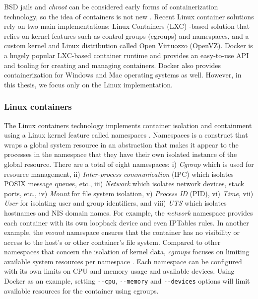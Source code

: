 \documentclass[english, 12pt, a4paper, sci, utf8, a-2b, online]{aaltothesis}
\begin{document}
BSD jails and \emph{chroot} can be considered early forms of containerization technology, so the idea of containers is not new \cite{combe2016docker}.
Recent Linux container solutions rely on two main implementations: Linux Containers (LXC) -based solution that relies on kernel features such as control groups (cgroups) and namespaces, and a custom kernel and Linux distribution called Open Virtuozzo (OpenVZ).
Docker \cite{docker} is a hugely popular LXC-based container runtime and provides an easy-to-use API and tooling for creating and managing containers.
Docker also provides containerization for Windows and Mac operating systems as well.
However, in this thesis, we focus only on the Linux implementation.

\subsubsection{Linux containers}

The Linux containers technology implements container isolation and containment using a Linux kernel feature called namespaces \cite{lin2018measurement}.
Namespaces \cite{manpages-namespace} is a construct that wraps a global system resource in an abstraction that makes it appear to the processes in the namespace that they have their own isolated instance of the global resource.
There are a total of eight namespaces: i) \emph{Cgroup} which is used for resource management, ii) \emph{Inter-process communication} (IPC) which isolates POSIX message queues, etc., iii) \emph{Network} which isolates network devices, stack ports, etc., iv) \emph{Mount} for file system isolation, v) \emph{Process ID} (PID), vi) \emph{Time}, vii) \emph{User} for isolating user and group identifiers, and viii) \emph{UTS} which isolates hostnames and NIS domain names.
For example, the \emph{network} namespace provides each container with its own loopback device and even IPTables rules.
In another example, the \emph{mount} namespace ensures that the container has no visibility or access to the host's or other container's file system.
Compared to other namespaces that concern the isolation of kernel data, \emph{cgroups} focuses on limiting available system resources per namespace \cite{lin2018measurement}.
Each namespace can be configured with its own limits on CPU and memory usage and available devices.
Using Docker as an example, setting \lstinline{--cpu}, \lstinline{--memory} and \lstinline{--devices} options will limit available resources for the container using cgroups.
\end{document}
